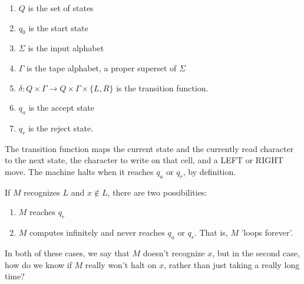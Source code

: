 
\begin{enumerate}
	\item[] $Q$ is the set of states
	\item[] $q_0$ is the start state
	\item[] $\Sigma$ is the input alphabet
	\item[] $\Gamma$ is the tape alphabet, a proper superset of $\Sigma$
	\item[] $\delta: Q\times\Gamma\rightarrow Q\times\Gamma\times\{L,R\}$ is the transition function.
	\item[] $q_a$ is the accept state
	\item[] $q_r$ is the reject state.
	
\end{enumerate}

The transition function maps the current state and the currently read character to the next state, the character to write on that cell, and a LEFT or RIGHT move.  The machine halts when it reaches $q_a$ or $q_r$, by definition.


If $M$ recognizes $L$ and $x\notin L$, there are two possibilities:

\begin{enumerate}
	\item $M$ reaches $q_r$
	\item $M$ computes infinitely and never reaches $q_a$ or $q_r$.  That is, $M$ 'loops forever'.
\end{enumerate}

In both of these cases, we say that $M$ doesn't recognize $x$, but in the second case, how do we know if $M$ really won't halt on $x$, rather than just taking a really long time?




